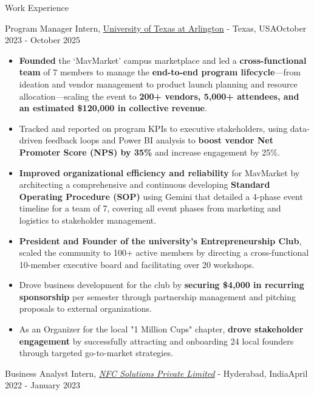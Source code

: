 \documentclass{resume} %
\begin{document}
\begin{rSection}{Work Experience}
\begin{rSubsection}
{Program Manager Intern, \href{https://www.uta.edu/research/centers/cetd}{University of Texas at Arlington} - Texas, USA}{October 2023 - October 2025}{}{}
\item[]
\begin{itemize}[left=-1.5em, labelsep=.1cm, labelwidth=.2cm, itemsep=0.0em]
\item \textbf{Founded} the ‘MavMarket’ campus marketplace and led a \textbf{cross-functional team }of 7 members to manage the \textbf{end-to-end program lifecycle}—from ideation and vendor management to product launch planning and resource allocation—scaling the event to \textbf{200+ vendors, 5,000+ attendees, and an estimated \$120,000 in collective revenue}.
\item Tracked and reported on program KPIs to executive stakeholders, using data-driven feedback loops and Power BI analysis to\textbf{ boost vendor Net Promoter Score (NPS) by 35\%} and increase engagement by 25\%.
\item \textbf{Improved organizational efficiency and reliability} for MavMarket by architecting a comprehensive and continuous developing \textbf{Standard Operating Procedure (SOP)} using Gemini that detailed a 4-phase event timeline for a team of 7, covering all event phases from marketing and logistics to stakeholder management.
\item \textbf{President and Founder of the university's Entrepreneurship Club}, scaled the community to 100+ active members by directing a cross-functional 10-member executive board and facilitating over 20 workshops.
\item Drove business development for the club by \textbf{securing \$4,000 in recurring sponsorship} per semester through partnership management and pitching proposals to external organizations.
\item As an Organizer for the local "1 Million Cups" chapter, \textbf{drove stakeholder engagement} by successfully attracting and onboarding 24 local founders through targeted go-to-market strategies. 
\end{itemize}
\end{rSubsection}

\begin{rSubsection}
{Business Analyst Intern, \href{https://nfcsolutionsusa.com/}{\textit{NFC Solutions Private Limited}} - Hyderabad, India}{April 2022 - January 2023}{}{}


\end{rSubsection}
\end{rSection}
\end{document}
